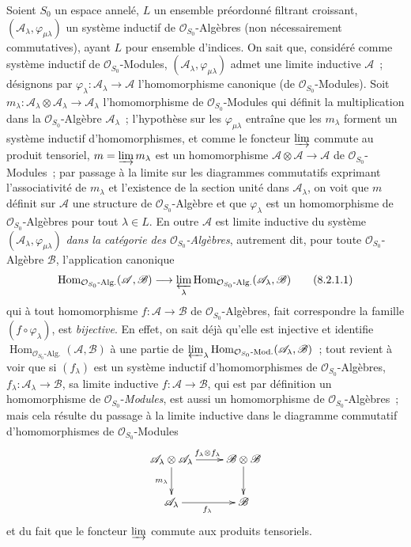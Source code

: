 \begin{env}[8.2.1]
\label{IV.8.2.1-fr}
Soient $S_0$ un espace annelé, $L$ un ensemble préordonné filtrant croissant,
$(\mathscr A_\lambda,\varphi_{\mu\lambda})$ un système inductif de
$\mathcal O_{S_0}$-Algèbres (non nécessairement commutatives), ayant $L$ pour
ensemble d'indices. On sait que, considéré comme système inductif de
$\mathcal O_{S_0}$-Modules, $(\mathscr A_\lambda,\varphi_{\mu\lambda})$ admet
une limite inductive $\mathscr A$~; désignons par
$\varphi_\lambda:\mathscr A_\lambda\to\mathscr A$ l'homomorphisme canonique
(de $\mathcal O_{S_0}$-Modules). Soit
$m_\lambda:\mathscr A_\lambda\otimes\mathscr A_\lambda\to\mathscr A_\lambda$
l'homomorphisme de $\mathcal O_{S_0}$-Modules qui définit la multiplication
dans la $\mathcal O_{S_0}$-Algèbre $\mathscr A_\lambda$~; l'hypothèse sur les
$\varphi_{\mu\lambda}$ entraîne que les $m_\lambda$ forment un système
inductif d'homomorphismes,
et comme le foncteur $\varinjlim$ commute au produit tensoriel,
$m=\varinjlim m_\lambda$ est un homomorphisme
$\mathscr A\otimes\mathscr A\to\mathscr A$ de
$\mathcal O_{S_0}$-Modules~; par passage à la limite sur les diagrammes
commutatifs exprimant l'associativité de $m_\lambda$ et l'existence de la
section unité dans $\mathscr A_\lambda$, on voit que $m$ définit sur
$\mathscr A$ une structure de $\mathcal O_{S_0}$-Algèbre et que
$\varphi_\lambda$ est un homomorphisme de $\mathcal O_{S_0}$-Algèbres pour
tout $\lambda\in L$. En outre $\mathscr A$ est limite inductive du système
$(\mathscr A_\lambda,\varphi_{\mu\lambda})$ \emph{dans la catégorie des
$\mathcal O_{S_0}$-Algèbres}, autrement dit, pour toute
$\mathcal O_{S_0}$-Algèbre $\mathscr B$, l'application canonique
\begin{equation}
\operatorname{Hom}_{\mathcal O_{S_0}\text{-Alg.}}(\mathscr A,\mathscr B)
\longrightarrow
\varprojlim_\lambda
\operatorname{Hom}_{\mathcal O_{S_0}\text{-Alg.}}
(\mathscr A_\lambda,\mathscr B)
\tag{8.2.1.1}\label{IV.8.2.1.1-fr}
\end{equation}
qui à tout homomorphisme $f:\mathscr A\to\mathscr B$ de
$\mathcal O_{S_0}$-Algèbres, fait correspondre la famille
$(f\circ\varphi_\lambda)$, est \emph{bijective}. En effet, on sait déjà
qu'elle est injective et identifie
$\operatorname{Hom}_{\mathcal O_{S_0}\text{-Alg.}}(\mathscr A,\mathscr B)$
à une partie de
$\varprojlim_\lambda
\operatorname{Hom}_{\mathcal O_{S_0}\text{-Mod.}}
(\mathscr A_\lambda,\mathscr B)$~; tout revient à voir que si $(f_\lambda)$
est un système inductif d'homomorphismes de $\mathcal O_{S_0}$-Algèbres,
$f_\lambda:\mathscr A_\lambda\to\mathscr B$, sa limite inductive
$f:\mathscr A\to\mathscr B$, qui est par définition un homomorphisme de
$\mathcal O_{S_0}$-\emph{Modules}, est aussi un homomorphisme de
$\mathcal O_{S_0}$-Algèbres~; mais cela résulte du passage à la limite
inductive dans le diagramme commutatif d'homomorphismes de
$\mathcal O_{S_0}$-Modules
\[
\xymatrix{
  \mathscr A_\lambda\otimes\mathscr A_\lambda
    \ar[r]^{f_\lambda\otimes f_\lambda} \ar[d]_{m_\lambda}
    & \mathscr B\otimes\mathscr B \ar[d] \\
  \mathscr A_\lambda \ar[r]_{f_\lambda} & \mathscr B
}
\]
et du fait que le foncteur $\varinjlim$ commute aux produits tensoriels.


\end{env}
